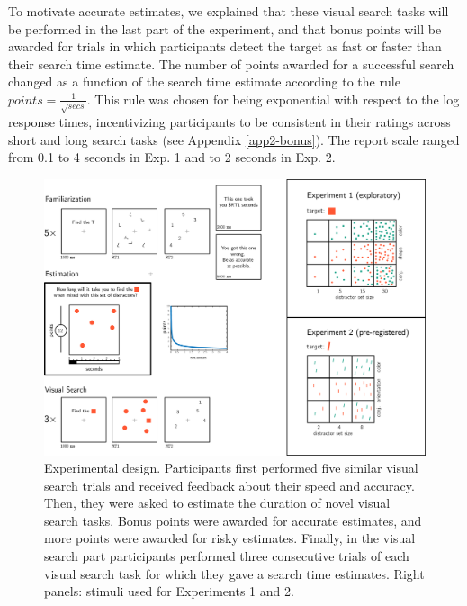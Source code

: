 \documentclass[12pt,twoside]{reedthesis}
\begin{document}
To motivate accurate estimates, we explained that these visual search tasks will be performed in the last part of the experiment, and that bonus points will be awarded for trials in which participants detect the target as fast or faster than their search time estimate. The number of points awarded for a successful search changed as a function of the search time estimate according to the rule
\(points=\frac{1}{\sqrt{secs}}\). This rule was chosen for being exponential with respect to the log response times, incentivizing participants to be consistent in their ratings across short and long search tasks (see Appendix \ref{app2-bonus}). The report scale ranged from 0.1 to 4 seconds in Exp. 1 and to 2 seconds in Exp. 2.
\begin{figure}

{\centering \includegraphics[width=1\linewidth]{figure/MVS/methods1} 

}

\caption[Meta visual search: experimental design]{Experimental design. Participants first performed five similar visual search trials and received feedback about their speed and accuracy. Then, they were asked to estimate the duration of novel visual search tasks. Bonus points were awarded for accurate estimates, and more points were awarded for risky estimates. Finally, in the visual search part participants performed three consecutive trials of each visual search task for which they gave a search time estimates. Right panels: stimuli used for Experiments 1 and 2.}\label{fig:MVS-methods1}
\end{figure}
\end{document}
